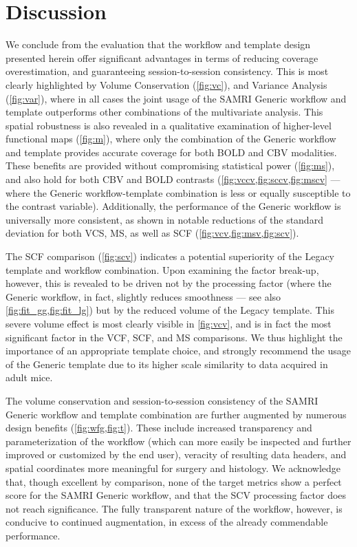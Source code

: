 \section{Discussion}

We conclude from the evaluation that the workflow and template design presented herein offer significant advantages in terms of reducing coverage overestimation, and guaranteeing session-to-session consistency.
This is most clearly highlighted by Volume Conservation (\cref{fig:vc}), and Variance Analysis (\cref{fig:var}), where in all cases the joint usage of the SAMRI Generic workflow and template outperforms other combinations of the multivariate analysis.
This spatial robustness is also revealed in a qualitative examination of higher-level functional maps (\cref{fig:m}), where only the combination of the Generic workflow and template provides accurate coverage for both BOLD and CBV modalities.
These benefits are provided without compromising statistical power (\cref{fig:ms}), and also hold for both CBV and BOLD contrasts (\cref{fig:vccv,fig:sccv,fig:mscv} --- where the Generic workflow-template combination is less or equally susceptible to the contrast variable).
Additionally, the performance of the Generic workflow is universally more consistent, as shown in notable reductions of the standard deviation for both VCS, MS, as well as SCF (\cref{fig:vcv,fig:msv,fig:scv}).

The SCF comparison (\cref{fig:scv}) indicates a potential superiority of the Legacy template and workflow combination.
Upon examining the factor break-up, however, this is revealed to be driven not by the processing factor (where the Generic workflow, in fact, slightly reduces smoothness --- see also \cref{fig:fit_gg,fig:fit_lg}) but by the reduced volume of the Legacy template.
This severe volume effect is most clearly visible in \cref{fig:vcv}, and is in fact the most significant factor in the VCF, SCF, and MS comparisons.
We thus highlight the importance of an appropriate template choice, and strongly recommend the usage of the Generic template due to its higher scale similarity to data acquired in adult mice.

The volume conservation and session-to-session consistency of the SAMRI Generic workflow and template combination are further augmented by numerous design benefits (\cref{fig:wfg,fig:t}).
These include increased transparency and parameterization of the workflow (which can more easily be inspected and further improved or customized by the end user), veracity of resulting data headers, and spatial coordinates more meaningful for surgery and histology.
We acknowledge that, though excellent by comparison, none of the target metrics show a perfect score for the SAMRI Generic workflow, and that the SCV processing factor does not reach significance.
The fully transparent nature of the workflow, however, is conducive to continued augmentation, in excess of the already commendable performance.

